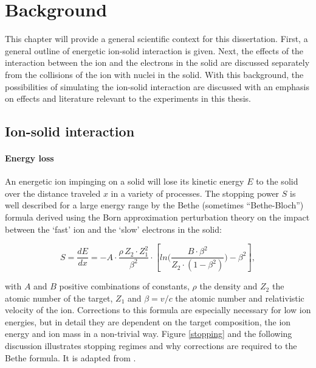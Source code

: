 \chapter{Background}

This chapter will provide a general scientific context for this dissertation. First, a general outline of energetic ion-solid interaction is given. Next, the effects of the interaction between the ion and the electrons in the solid are discussed separately from the collisions of the ion with nuclei in the solid. With this background, the possibilities of simulating the ion-solid interaction are discussed with an emphasis on effects and literature relevant to the experiments in this thesis. 

\section{Ion-solid interaction}
\label{sec:ionsolid}

\subsubsection{Energy loss}

An energetic ion impinging on a solid will lose its kinetic energy $E$ to the solid over the distance traveled $x$ in a variety of processes. The stopping power $S$ is well described for a large energy range by the Bethe (sometimes ``Bethe-Bloch'') formula derived using the Born approximation perturbation theory on the impact between the `fast' ion and the `slow' electrons in the solid: 

\begin{equation}
S = \frac{dE}{dx} = - A \cdot \frac{\rho\,Z_2\cdot Z_1^2}{\beta^2} \cdot \left[ln\Big(\frac{B\cdot\beta^2}{Z_2\cdot(1-\beta^2)}\Big)-\beta^2\right] ,
\end{equation}


with $A$ and $B$ positive combinations of constants, $\rho$ the density and $Z_2$ the atomic number of the target, $Z_1$ and $\beta = v/c$ the atomic number and relativistic velocity of the ion. Corrections to this formula are especially necessary for low ion energies, but in detail they are dependent on the target composition, the ion energy and ion mass in a non-trivial way. Figure \ref{stopping} and the following discussion illustrates stopping regimes and why corrections are required to the Bethe formula. It is adapted from \cite{sigmund_stopping_2004}.

